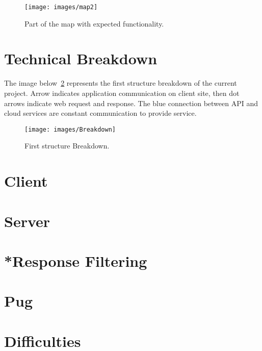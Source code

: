 \documentclass[12pt]{article}
\numberwithin{equation}{section} %
\numberwithin{figure}{section} %
\numberwithin{table}{section} %
\begin{document}
	\begin{figure}[H]
		\centering        
		\texttt{[image: images/map2]}
		\caption{Part of the map with expected functionality.}
		\label{fig:map2}
	\end{figure}
		
\newpage
\section{Technical Breakdown}	
	The image below~\ref{fig:break} represents the first structure breakdown of the current project. Arrow indicates application communication on client site, then dot arrows indicate web request and response. The blue connection between API and cloud services are constant communication to provide service.
	\begin{figure}[H]
		\centering		
		\texttt{[image: images/Breakdown]}
		\caption{First structure Breakdown.}
		\label{fig:break}
	\end{figure}	
\newpage
\section{Client}
		
\section{Server}
\section{*Response Filtering}

\section{Pug}

\section{Difficulties}
	
\end{document}
